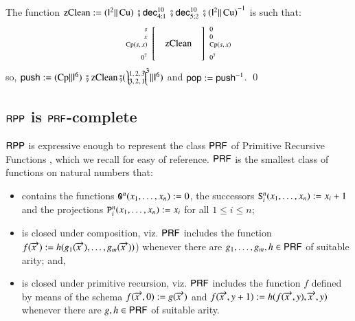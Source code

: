 \begin{prf}
The function 
$\operatorname{zClean}:= 
(\mathsf{I}^2 \rVert \operatorname{Cu})\, 
 \fatsemi \mathsf{dec}^{10}_{4;1}\, 
 \fatsemi \mathsf{dec}^{10}_{5;2}\, 
 \fatsemi {( \mathsf{I}^2 \rVert \operatorname{Cu})}^{-1} 
$ 
is such that:
$$\begin{array}{rcl}
 \left. {\scriptsize \begin{array}{r} 
                       s\\ x\\ \operatorname{Cp}(s,x)\\ \\[-1mm] 0^{7}
                     \end{array}} \right[
 & \operatorname{zClean} &
 \left] {\scriptsize \begin{array}{l}
                       0\\ 0\\ \operatorname{Cp}(s,x)\\  \\[-1mm] 0^{7}
                     \end{array} } \right.
\end{array}$$
so,
$\rprPush : =
(\rprPCom{\CP} {\rprId^{6}})\, 
          \rprSeq \operatorname{zClean}
       \rprSeq (\rprPCom{\rprSwap{3}{1,2,3}{3,2,1}}{\rprId^{6}})$ 
and 
$\mathsf{pop}  := {\mathsf{push}}^{-1}$.
\qed
\end{prf}



\subsection{$ \mathsf{RPP} $ is $ \mathsf{P}\mathsf{RF} $-complete} $ \mathsf{RPP} $ is expressive enough to represent 
the class $ \mathsf{P}\mathsf{RF} $ of Primitive Recursive Functions \cite{cutland1980book,odifreddi1989book}, which we recall for easy 
of reference. $ \mathsf{P}\mathsf{RF} $ is the smallest class of functions on natural numbers that:
\begin{itemize}
\item 
 contains the functions $\mathtt{0}^n(x_1,\ldots,x_n):=0$, the successors 
$\mathtt{S}^n_i(x_1,\ldots,x_n) := x_i + 1$  and  the projections 
$ \mathtt{P}^{n}_{i}(x_1,\ldots,x_n) := x_i $ for all $1\leq i\leq n$;

\item 
 is closed under composition, viz. $ \mathsf{P}\mathsf{RF} $  includes the function $f(\overrightarrow{{\!\!x}}) := h(g_1(\overrightarrow{{\!\!x}}), \ldots , g_m(\overrightarrow{{\!\!x}}))$)
whenever there are  $g_1, \ldots, g_m, h\in\mathsf{P}\mathsf{RF}$ of suitable arity; and,

\item 
 is closed under primitive recursion, viz. $ \mathsf{P}\mathsf{RF} $ includes the function $f$ defined   by means of the schema $f(\overrightarrow{{\!\!x}},0):= g(\overrightarrow{{\!\!x}})$ and 
$f(\overrightarrow{{\!\!x}},y+1):= h(f(\overrightarrow{{\!\!x}},y),\overrightarrow{{\!\!x}},y)$ whenever there are  $g,h\in\mathsf{P}\mathsf{RF}$  of suitable arity.
\end{itemize}


